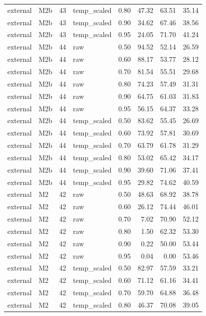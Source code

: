 \begin{tabular}{llrlrrrr}
external & M2b & 43 & temp\_scaled & 0.80 & 47.32 & 63.51 & 35.14 \\
external & M2b & 43 & temp\_scaled & 0.90 & 34.62 & 67.46 & 38.56 \\
external & M2b & 43 & temp\_scaled & 0.95 & 24.05 & 71.70 & 41.24 \\
external & M2b & 44 & raw & 0.50 & 94.52 & 52.14 & 26.59 \\
external & M2b & 44 & raw & 0.60 & 88.17 & 53.77 & 28.12 \\
external & M2b & 44 & raw & 0.70 & 81.54 & 55.51 & 29.68 \\
external & M2b & 44 & raw & 0.80 & 74.23 & 57.49 & 31.31 \\
external & M2b & 44 & raw & 0.90 & 64.75 & 61.03 & 31.83 \\
external & M2b & 44 & raw & 0.95 & 56.15 & 64.37 & 33.28 \\
external & M2b & 44 & temp\_scaled & 0.50 & 83.62 & 55.45 & 26.69 \\
external & M2b & 44 & temp\_scaled & 0.60 & 73.92 & 57.81 & 30.69 \\
external & M2b & 44 & temp\_scaled & 0.70 & 63.79 & 61.78 & 31.29 \\
external & M2b & 44 & temp\_scaled & 0.80 & 53.02 & 65.42 & 34.17 \\
external & M2b & 44 & temp\_scaled & 0.90 & 39.60 & 71.06 & 37.41 \\
external & M2b & 44 & temp\_scaled & 0.95 & 29.82 & 74.62 & 40.59 \\
external & M2 & 42 & raw & 0.50 & 48.63 & 68.92 & 38.78 \\
external & M2 & 42 & raw & 0.60 & 26.12 & 74.44 & 46.01 \\
external & M2 & 42 & raw & 0.70 & 7.02 & 70.90 & 52.12 \\
external & M2 & 42 & raw & 0.80 & 1.50 & 62.32 & 53.30 \\
external & M2 & 42 & raw & 0.90 & 0.22 & 50.00 & 53.44 \\
external & M2 & 42 & raw & 0.95 & 0.04 & 0.00 & 53.46 \\
external & M2 & 42 & temp\_scaled & 0.50 & 82.97 & 57.59 & 33.21 \\
external & M2 & 42 & temp\_scaled & 0.60 & 71.12 & 61.16 & 34.41 \\
external & M2 & 42 & temp\_scaled & 0.70 & 59.70 & 64.88 & 36.48 \\
external & M2 & 42 & temp\_scaled & 0.80 & 46.37 & 70.08 & 39.05 \\

\end{tabular}
